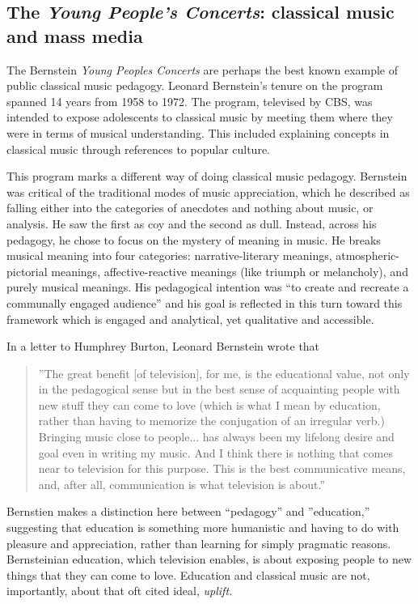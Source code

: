 \documentclass[12pt,letterpaper]{article}
\begin{document}
		
	\subsection*{The \textit{Young People's Concerts}: classical music and 
	mass media}

	\noindent The Bernstein \textit{Young Peoples Concerts} are perhaps the
	best known example of public classical music pedagogy. Leonard 
	Bernstein's tenure
	on the program spanned 14 years from 1958 to 1972. The program, televised by
	CBS, was intended to expose adolescents to classical music by meeting 
	them where they were in terms of musical understanding. This included  
	explaining concepts in classical music through references to popular 
	culture.    

	This program marks a different way of doing classical 
	music
	pedagogy. Bernstein was critical of the traditional modes of music 
	appreciation, which he described as falling either into the categories 
	of anecdotes and nothing about music, or analysis. He saw the first as 
	coy and
	the second as dull. Instead, across his pedagogy, he chose to focus on 
	the mystery of meaning in music. He breaks musical meaning into four 
	categories: narrative-literary meanings, atmospheric-pictorial meanings,
	affective-reactive meanings (like triumph or melancholy), and purely 
	musical meanings.\autocite[14]{Kopfstein}  His pedagogical intention 
	was ``to create and recreate a communally engaged 
	audience''\autocite[51]{Kopfstein} and his goal is reflected in this
	turn toward this framework which is engaged and analytical, yet 
	qualitative and accessible.  
 	
	In a letter to Humphrey Burton, Leonard Bernstein wrote that 

	\begin{quote}
	''The great
	benefit [of television], for me, is the educational value, not only in 
	the pedagogical sense but in the best sense of acquainting people with 
	new stuff they can come to love (which is what I mean by education, 
	rather than having to memorize the conjugation of an irregular verb.) 
	Bringing music close to people... has always been my lifelong desire and
	goal even in writing my music. And I think there is nothing that comes 
	near to television for this purpose. This is the best communicative 
	means, and, after all, communication is what television is 
	about.''\autocite[71]{Kopfstein}
	\end{quote}

	Bernstien makes a distinction here between ``pedagogy'' and 
	''education,'' suggesting that education is something more humanistic 
	and having to do with pleasure and appreciation, rather than learning 
	for simply pragmatic reasons. Bernsteinian education, which television 
	enables, is about exposing people to new things that they can come to 
	love. Education and classical music are not, importantly, about 
	that oft cited ideal, \textit{uplift.} 
\end{document}
